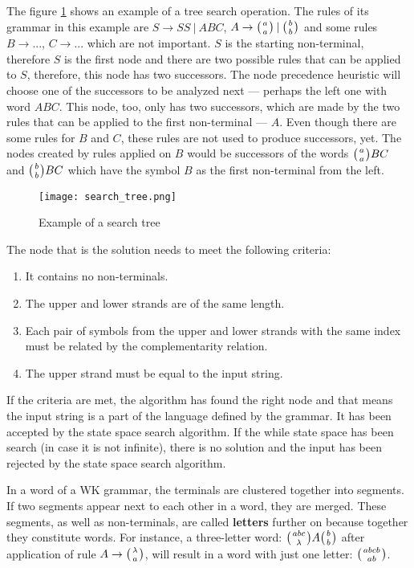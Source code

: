 The figure \ref{fig:search_tree} shows an example of a tree search operation. The rules of its grammar in this example are $S \rightarrow S S \:|\: A B C$, $A \rightarrow \wkpair{a}{a} \:|\: \wkpair{b}{b}$ and some rules $B \rightarrow ...$, $C \rightarrow ...$ which are not important. $S$ is the starting non-terminal, therefore $S$ is the first node and there are two possible rules that can be applied to $S$, therefore, this node has two successors. The node precedence heuristic will choose one of the successors to be analyzed next --- perhaps the left one with word $A B C$. This node, too, only has two successors, which are made by the two rules that can be applied to the first non-terminal --- $A$. Even though there are some rules for $B$ and $C$, these rules are not used to produce successors, yet. The nodes created by rules applied on $B$ would be successors of the words $\wkpair{a}{a} B C$ and $\wkpair{b}{b} B C$ which have the symbol $B$ as the first non-terminal from the left.

\begin{figure}[h]
  \centering
  \texttt{[image: search\_tree.png]}
  \caption{Example of a search tree}
  \label{fig:search_tree}
\end{figure}

The node that is the solution needs to meet the following criteria:
\begin{enumerate}
  \item{It contains no non-terminals.}
  \item{The upper and lower strands are of the same length.}
  \item{Each pair of symbols from the upper and lower strands with the same index must be related by the complementarity relation.}
  \item{The upper strand must be equal to the input string.}
\end{enumerate}
If the criteria are met, the algorithm has found the right node and that means the input string is a part of the language defined by the grammar. It has been accepted by the state space search algorithm. If the while state space has been search (in case it is not infinite), there is no solution and the input has been rejected by the state space search algorithm.

In a word of a WK grammar, the terminals are clustered together into segments. If two segments appear next to each other in a word, they are merged. These segments, as well as non-terminals, are called \textbf{letters} further on because together they constitute words. For instance, a three-letter word: $\wkpair{abc}{\lambda} A \wkpair{b}{b}$ after application of rule $A \rightarrow \wkpair{\lambda}{a}$, will result in a word with just one letter: $\wkpair{abcb}{ab}$.

